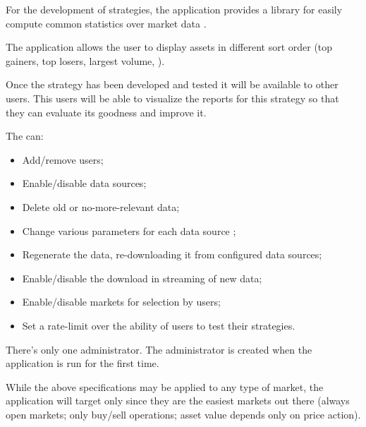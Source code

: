For the development of strategies, the application provides a library for easily
compute common statistics over market data .

The application allows the user to display assets in different sort order (top
gainers, top losers, largest volume, \etc).

Once the strategy has been developed and tested it will be available to other users. This users will be able to visualize the reports for this strategy so that they can evaluate its goodness and improve it. 

The  can:
\begin{itemize}
	\item Add/remove users;
	\item Enable/disable data sources;
	\item Delete old or no-more-relevant data;
	\item Change various parameters for each data source ;
	\item Regenerate the data, re-downloading it from configured data
		sources;
	\item Enable/disable the download in streaming of new data;
	\item Enable/disable markets for selection by users;
	\item Set a rate-limit over the ability of users to test their
		strategies.
\end{itemize}

There's only one administrator. The administrator is created when the
application is run for the first time.

While the above specifications may be applied to any type of market, the
application will target only  since they are
the easiest markets out there (always open markets; only buy/sell operations;
asset value depends only on price action).
